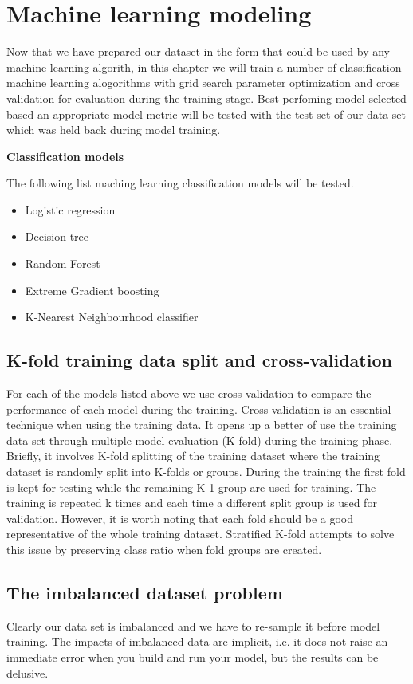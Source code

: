 \chapter{Machine learning modeling}
Now that we have prepared our dataset in the form that could be used by any machine learning algorith, in this chapter we will train a number of classification machine learning alogorithms with grid search parameter optimization and cross validation for evaluation during the training stage. Best perfoming model selected based an appropriate model metric will be tested with the test set of our data set which was held back during model training. 

\textbf{Classification models}

The following list maching learning classification models will be tested.
\begin{itemize}
\item Logistic regression
\item Decision tree
\item Random Forest
\item Extreme Gradient boosting
\item K-Nearest Neighbourhood classifier
\end{itemize}

\section{K-fold training data split and cross-validation}
For each of the models listed above we use cross-validation to compare the performance of each model during the training. 
Cross validation is an essential technique when using the training data. It opens up a better of use the training data set through multiple model evaluation (K-fold) during the training phase. Briefly, it involves K-fold splitting of the training dataset where the training dataset is randomly split into K-folds or groups. During the training the first fold is kept for testing while the remaining K-1 group are used for training. The training is repeated k times and each time a different split group is used for validation. However, it is worth noting that each fold should be a good representative of the whole training dataset. Stratified K-fold attempts to solve this issue by preserving class ratio when fold groups are created. 

\section{The imbalanced dataset problem}
Clearly our data set is imbalanced and we have to re-sample it before model training. The impacts of imbalanced data are implicit, i.e. it does not raise an immediate error when you build and run your model, but the results can be delusive.
